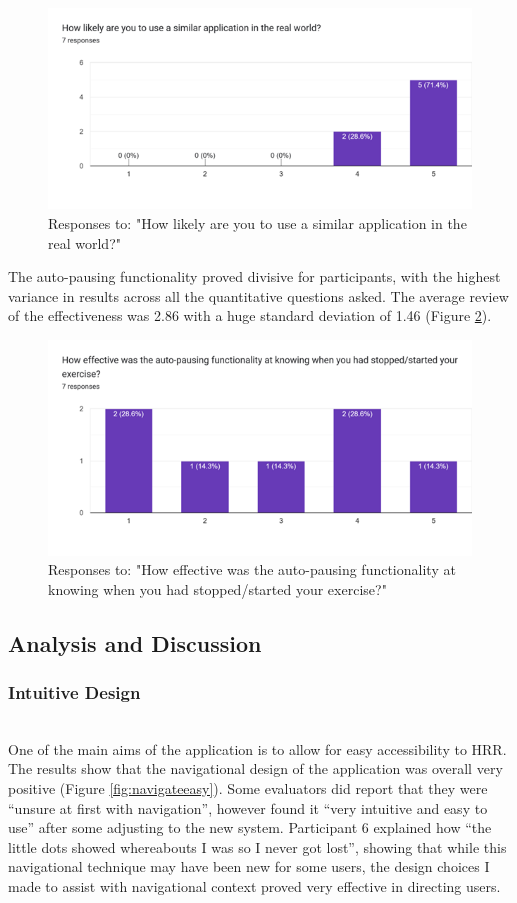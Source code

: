 \documentclass{l4proj}
\begin{document}
\begin{figure}[h!]
    \centering
    \includegraphics[width=0.62\linewidth]{dissertation//dissImages/UseApplication.png}
    \caption{Responses to: "How likely are you to use a similar application in the real world?"}
    \label{fig:useapp}
\end{figure}


The auto-pausing functionality proved divisive for participants, with the highest variance in results across all the quantitative questions asked. The average review of the effectiveness was 2.86 with a huge standard deviation of 1.46 (Figure \ref{fig:autopause}).


\begin{figure}[h!]
    \centering
    \includegraphics[width=0.62\linewidth]{dissertation//dissImages/PauseEffective.png}
    \caption{Responses to: "How effective was the auto-pausing functionality at knowing when you had stopped/started your exercise?"}
    \label{fig:autopause}
\end{figure}

\subsection{Analysis and Discussion}
\label{sec:userstudyanalysis}

\subsubsection{Intuitive Design}
\noindent\mbox{}\\

One of the main aims of the application is to allow for easy accessibility to HRR. The results show that the navigational design of the application was overall very positive (Figure \ref{fig:navigateeasy}). Some evaluators did report that they were “unsure at first with navigation”, however found it “very intuitive and easy to use” after some adjusting to the new system. Participant 6 explained how “the little dots showed whereabouts I was so I never got lost”, showing that while this navigational technique may have been new for some users, the design choices I made to assist with navigational context proved very effective in directing users.
\end{document}
